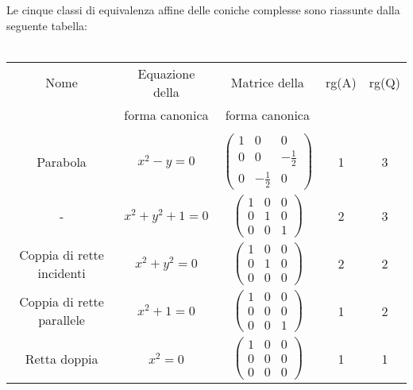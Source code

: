  Le cinque classi di equivalenza affine delle coniche complesse sono riassunte dalla seguente tabella:\\
 \vspace{5mm}\\
 \begin{tabular}{|c|c|c|c|c|}
 \hline
  Nome & Equazione della & Matrice della & rg(A) & rg(Q)\\
   &  forma canonica & forma canonica & & \\
  \hline
  & & & & \\
  Parabola & $x^2-y=0$ & $\left(\begin{smallmatrix} 1 & 0 & 0 \\ 0 & 0 & -\frac{1}{2}\\ 0 & -\frac{1}{2} & 0 \end{smallmatrix}\right)$ & 1 & 3 \\
  - & $x^2+y^2+1=0$ & $\left(\begin{smallmatrix} 1 & 0 & 0 \\ 0 & 1 & 0 \\ 0 & 0 & 1 \end{smallmatrix}\right)$ & 2 & 3 \\
  Coppia di rette incidenti & $x^2+y^2=0$ & $\left(\begin{smallmatrix} 1 & 0 & 0 \\ 0 & 1 & 0 \\ 0 & 0 & 0 \end{smallmatrix}\right)$ & 2 & 2 \\
  Coppia di rette parallele & $x^2+1=0$ & $\left(\begin{smallmatrix} 1 & 0 & 0 \\ 0 & 0 & 0 \\ 0 & 0 & 1 \end{smallmatrix}\right)$ & 1 & 2 \\
  Retta doppia & $x^2=0$ & $\left(\begin{smallmatrix} 1 & 0 & 0 \\ 0 & 0 & 0 \\ 0 & 0 & 0 \end{smallmatrix}\right)$ & 1 & 1 \\
  \hline
 \end{tabular}
 
